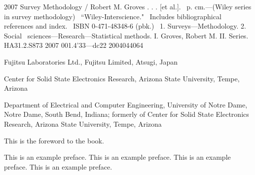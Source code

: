 \documentclass{wileySix}
\begin{document}
\subtitle{Buku Phalcon Untuk Pemula}




\halftitlepage

\titlepage


\begin{copyrightpage}{2007}
Survey Methodology / Robert M. Groves . . . [et al.].
\       p. cm.---(Wiley series in survey methodology)
\    ``Wiley-Interscience."
\    Includes bibliographical references and index.
\    ISBN 0-471-48348-6 (pbk.)
\    1. Surveys---Methodology.  2. Social
\  sciences---Research---Statistical methods.  I. Groves, Robert M.  II. %
Series.\\

HA31.2.S873 2007
001.4'33---dc22                                             2004044064
\end{copyrightpage}



\dedication{To my parents}

\begin{contributors}
 Fujitsu Laboratories Ltd., Fujitsu Limited, Atsugi,
Japan

 Center for Solid State Electronics Research, Arizona
State University, Tempe, Arizona

 Department of Electrical and
Computer Engineering, University of Notre Dame, Notre Dame, South Bend,
Indiana; formerly of
Center for Solid State Electronics Research, Arizona
State University, Tempe, Arizona
\end{contributors}

\contentsinbrief
\tableofcontents
\listoffigures
\listoftables


\begin{foreword}
This is the foreword to the book.
\end{foreword}

\begin{preface}
This is an example preface.
This is an example preface.
This is an example preface.
This is an example preface.


\end{preface}
\end{document}
